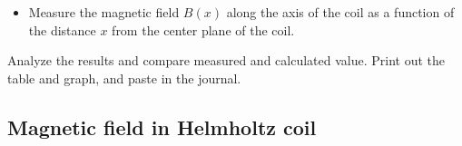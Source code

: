 \documentclass[../Elmag-labhefte-2020.tex]{subfiles}
\begin{document}
\begin{itemize}
\begin{marginfigure}
        \caption{%
            The coil circuit.
            Mascot power supply, multimeter, and the coil are shown.
            Note the direction of the windings, and where the coil is here shown from the direction of the connectors on the coil.
        }
        \label{magnetfelt.fig6}
    \end{marginfigure}

    \item Measure the magnetic field $B(x)$ along the axis of the coil as a function of the distance $x$ from the center plane of the coil.
\end{itemize}
 
Analyze the results and compare measured and calculated value. Print out the table and graph, and paste in the journal.

\subsection{Magnetic field in Helmholtz coil}
\end{document}
